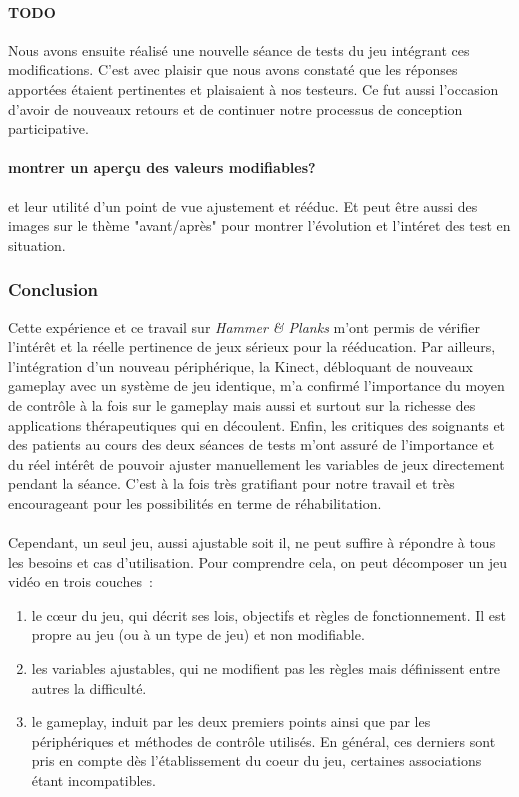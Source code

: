 		
	\paragraph{TODO} Nous avons ensuite réalisé une nouvelle séance de tests du jeu intégrant ces modifications. C'est avec plaisir que nous avons constaté que les réponses apportées étaient pertinentes et plaisaient à nos testeurs. Ce fut aussi l'occasion d'avoir de nouveaux retours et de continuer notre processus de conception participative.
	
\paragraph{montrer un aperçu des valeurs modifiables?} et leur utilité d'un point de vue
ajustement et rééduc. Et peut être aussi des images sur le thème "avant/après" pour montrer l'évolution et l'intéret des test en situation.

	\subsubsection*{Conclusion}
	Cette expérience et ce travail sur \emph{Hammer \& Planks} m'ont permis de vérifier l'intérêt et la réelle pertinence de jeux sérieux pour la rééducation. Par ailleurs, l'intégration d'un nouveau périphérique, la Kinect, débloquant de nouveaux gameplay avec un système de jeu identique, m'a confirmé l'importance du moyen de contrôle à la fois sur le gameplay mais aussi et surtout sur la richesse des applications thérapeutiques qui en découlent. Enfin, les critiques des soignants et des patients au cours des deux séances de tests m'ont assuré de l'importance et du réel intérêt de pouvoir ajuster manuellement les variables de jeux directement pendant la séance. C'est à la fois très gratifiant pour notre travail et très encourageant pour les possibilités en terme de réhabilitation.
	
\paragraph{}
Cependant, un seul jeu, aussi ajustable soit il, ne peut suffire à répondre à tous les besoins et cas d'utilisation. Pour comprendre cela, on peut décomposer un jeu vidéo en trois couches~:
\begin{enumerate}
	\item le cœur du jeu, qui décrit ses lois, objectifs et règles de fonctionnement. Il est propre au jeu (ou à un type de jeu) et non modifiable.
	\item les variables ajustables, qui ne modifient pas les règles mais définissent entre autres la difficulté.
	\item le gameplay, induit par les deux premiers points ainsi que par les périphériques et méthodes de contrôle utilisés. En général, ces derniers sont pris en compte dès l'établissement du coeur du jeu, certaines associations étant incompatibles.
\end{enumerate}

